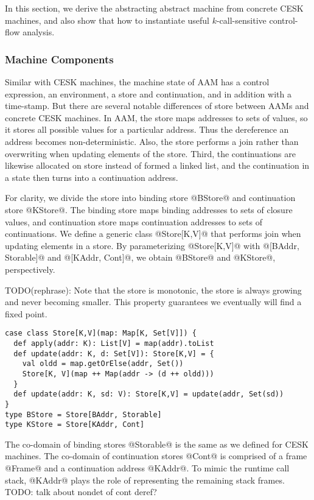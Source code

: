 \documentclass[acmsmall,review,anonymous]{acmart}\settopmatter{printfolios=true,printccs=false,printacmref=false}
\begin{document}
In this section, we derive the abstracting abstract machine from concrete
CESK machines, and also show that how to instantiate
useful $k$-call-sensitive control-flow analysis.

\subsubsection{Machine Components}

Similar with CESK machines, the machine state of AAM has a control expression,
an environment, a store and continuation, and in addition with a time-stamp.
But there are several notable differences of store between AAMs and concrete CESK machines.
In AAM, the store maps addresses to sets of values, so it stores all possible values
for a particular address. Thus the dereference an address becomes non-deterministic.
Also, the store performs a join rather than overwriting when updating elements of the store.
Third, the continuations are likewise allocated on store instead of formed a linked list,
and the continuation in a state then turns into a continuation address.

For clarity, we divide the store into binding store @BStore@ and continuation store @KStore@. 
The binding store maps binding addresses to sets of closure values, and continuation store maps
continuation addresses to sets of continuations.
We define a generic class @Store[K,V]@ that performs join when updating elements
in a store. By parameterizing @Store[K,V]@ with @[BAddr, Storable]@ and 
@[KAddr, Cont]@, we obtain @BStore@ and @KStore@, perspectively.

TODO(rephrase): Note that the store is monotonic, the store is always growing and never becoming 
smaller. This property guarantees we eventually will find a fixed point.

\begin{lstlisting}
case class Store[K,V](map: Map[K, Set[V]]) {
  def apply(addr: K): List[V] = map(addr).toList
  def update(addr: K, d: Set[V]): Store[K,V] = {
    val oldd = map.getOrElse(addr, Set())
    Store[K, V](map ++ Map(addr -> (d ++ oldd)))
  }
  def update(addr: K, sd: V): Store[K,V] = update(addr, Set(sd))
}
type BStore = Store[BAddr, Storable]
type KStore = Store[KAddr, Cont]
\end{lstlisting}

The co-domain of binding stores @Storable@ is the same
as we defined for CESK machines.
The co-domain of continuation stores @Cont@ is comprised of 
a frame @Frame@ and a continuation address @KAddr@.
To mimic the runtime call stack, @KAddr@ plays the role of
representing the remaining stack frames.
TODO: talk about nondet of cont deref?
\end{document}
